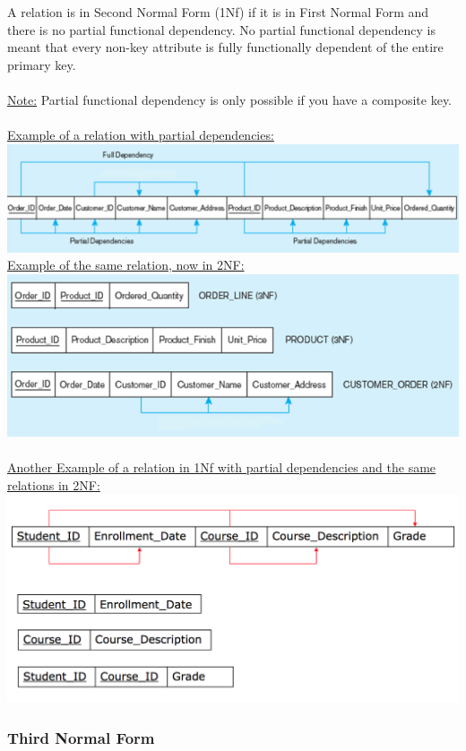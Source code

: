 \documentclass[12pt]{article}
\begin{document}
A relation is in Second Normal Form (1Nf) if it is in First Normal Form and there is no partial functional dependency. No partial functional dependency is meant that every non-key attribute is fully functionally dependent of the entire primary key.\\
\\
\underline{Note:} Partial functional dependency is only possible if you have a composite key.\\
\\
\underline{Example of a relation with partial dependencies:}\\
\includegraphics[scale=0.6]{lec6-1}\\
\underline{Example of the same relation, now in 2NF:}\\
\includegraphics[scale=0.85]{lec6-2}\\
\\
\underline{Another Example of a relation in 1Nf with partial dependencies and the same relations in 2NF:}\\
\includegraphics[scale=0.6]{lec6-3}

\subsubsection{Third Normal Form}
\end{document}
